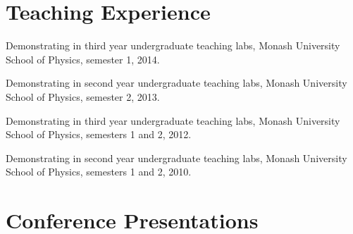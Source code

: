 \documentclass[10pt,a4paper]{article}
\renewenvironment{itemize}{
  \begin{list}{}{
    \setlength{\leftmargin}{1.5em}
    \setlength{\itemsep}{0.25em}
    \setlength{\parskip}{0pt}
    \setlength{\parsep}{0.25em}
  }
}{
  \end{list}
}
\begin{document}
\section*{Teaching Experience}

\begin{itemize}
\item Demonstrating in third year undergraduate teaching labs, Monash University School of Physics, semester 1, 2014.
\item Demonstrating in second year undergraduate teaching labs, Monash University School of Physics, semester 2, 2013.
\item Demonstrating in third year undergraduate teaching labs, Monash University School of Physics, semesters 1 and 2, 2012.
\item Demonstrating in second year undergraduate teaching labs, Monash University School of Physics, semesters 1 and 2, 2010.
\end{itemize}

\section*{Conference Presentations}
\end{document}
